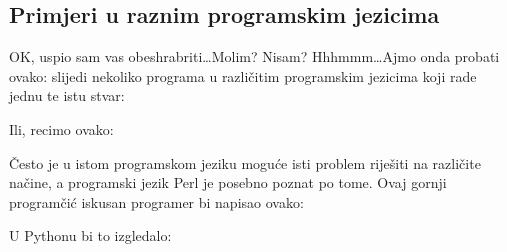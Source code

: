 	\subsection{Primjeri u raznim programskim jezicima}

	OK, uspio sam vas obeshrabriti\dots Molim? Nisam? Hhhmmm\dots Ajmo onda probati
	ovako: slijedi nekoliko programa u razli\v{c}itim programskim jezicima koji rade
	jednu te istu stvar:


	Ili, recimo ovako:


	\v{C}esto je u istom programskom jeziku mogu\'{c}e isti problem rije\v{s}iti na
	razli\v{c}ite na\v{c}ine, a programski jezik Perl je posebno poznat po tome. 
	Ovaj gornji program\v{c}i\'{c} iskusan programer bi napisao ovako:


	U Pythonu bi to izgledalo:

	
